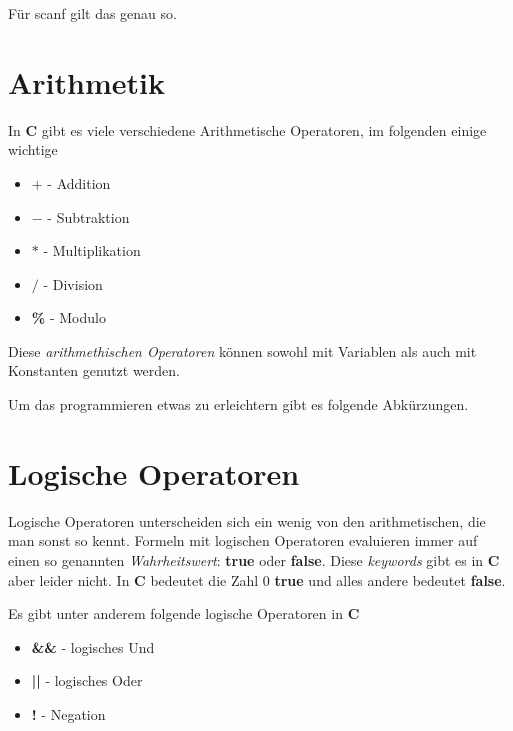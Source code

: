 \documentclass[c_worksheet.tex]{subfiles}
\begin{document}
Für scanf gilt das genau so.

\section{Arithmetik}

In \textbf{C} gibt es viele verschiedene Arithmetische Operatoren, im folgenden einige wichtige

\begin{itemize}
 	\item \textbf{\(+\)} - Addition
 	\item \textbf{\(-\)} - Subtraktion
 	\item \textbf{\(*\)} - Multiplikation
 	\item \textbf{\(/\)} - Division
 	\item \textbf{\%} - Modulo   
 \end{itemize} 

 Diese \emph{arithmethischen Operatoren} können sowohl mit Variablen als auch mit Konstanten genutzt werden.

  

Um das programmieren etwas zu erleichtern gibt es folgende Abkürzungen.

 



\section{Logische Operatoren} 


Logische Operatoren unterscheiden sich ein wenig von den arithmetischen, die man sonst so kennt. Formeln mit logischen Operatoren evaluieren immer auf einen so genannten \emph{Wahrheitswert}: \textbf{true} oder \textbf{false}. Diese \emph{keywords} gibt es in \textbf{C} aber leider nicht. In \textbf{C} bedeutet die Zahl \(0\) \textbf{true} und alles andere bedeutet \textbf{false}.

Es gibt unter anderem folgende logische Operatoren in \textbf{C}

\begin{itemize}
	\item \textbf{\&\&} - logisches Und
	\item \textbf{||} - logisches Oder
	\item \textbf{!}  - Negation
\end{itemize}
\end{document}
